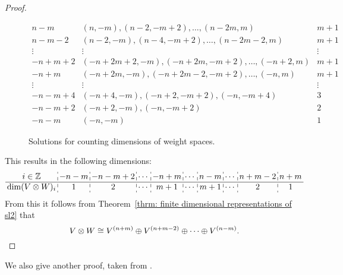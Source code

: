 \begin{proof}
\begin{figure}
\[\begin{array}{c|c|c}
  n-m    & (n, -m), (n-2, -m+2), \dotsc,  (n-2m, m)      & m+1    \\
  n-m-2  & (n-2, -m), (n-4, -m+2), \dotsc, (n-2m-2, m)   & m+1    \\
  \vdots & \vdots                                        & \vdots \\
  -n+m+2 & (-n+2m+2,-m), (-n+2m, -m+2), \dotsc, (-n+2,m) & m+1    \\
  -n+m   & (-n+2m,-m), (-n+2m-2, -m+2), \dotsc, (-n,m)   & m+1    \\
  \vdots & \vdots                                        & \vdots \\
  -n-m+4 & (-n+4,-m), (-n+2,-m+2), (-n,-m+4)             & 3      \\
  -n-m+2 & (-n+2,-m), (-n,-m+2)                          & 2      \\
  -n-m   & (-n,-m)                                       & 1
  \end{array}
 \]
 \caption{Solutions for counting dimensions of weight spaces.}
 \label{fig: solutions for counting dimensions}
 \end{figure}
 This results in the following dimensions:
 \[
  \setlength\arraycolsep{2pt}
  \begin{array}{c:c:c:c:c:c:c:c:c:c}
   i \in \Z            & -n-m & -n-m+2 & \cdots & -n+m & \cdots & n-m & \cdots & n+m-2 & n+m \\
   \hline
   \dim(V \otimes W)_i & 1    & 2      & \cdots & m+1  & \cdots & m+1 & \cdots & 2     & 1
  \end{array}
 \]
 From this it follows from Theorem~\ref{thrm: finite dimensional representations of sl2} that
 \[
  V \otimes W \cong V^{(n+m)} \oplus V^{(n+m-2)} \oplus \dotsb \oplus V^{(n-m)}.
  \qedhere
 \]
\end{proof}


We also give another proof, taken from \cite[\S 1.4]{Lectures_on_sl2_modules}.






















